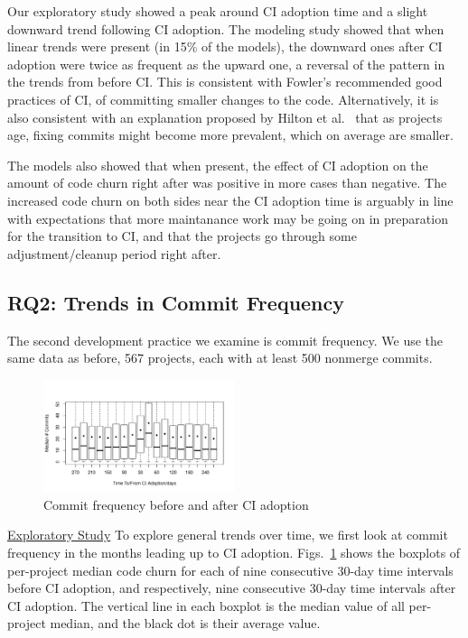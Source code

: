 Our exploratory study showed a peak around CI adoption time and a slight downward trend following CI adoption.
The modeling study showed that when linear trends were present (in 15\% of the models), the downward ones after CI adoption were twice  as frequent as the upward one, a reversal of the pattern in the trends from before CI.
This is consistent with Fowler's recommended good practices of CI, of committing smaller changes to the code.
Alternatively, it is also consistent with an explanation proposed by Hilton et al.~\cite{Hilton2016} that as projects age, fixing commits might become more prevalent, which on average are smaller.

The models also showed that when present, the effect of CI adoption on the amount of code churn right after was positive in more cases than negative.
The increased code churn on both sides near the CI adoption time is arguably in line with expectations that more maintanance work may be going on in preparation for the transition to CI, and that the projects go through some adjustment/cleanup period right after.


\subsection{RQ2: Trends in Commit Frequency}

The second development practice we examine is commit frequency.
We use the same data as before, 567 projects, each with at least 500 nonmerge commits.

\begin{figure}[!t]
\centering
\includegraphics[width=0.5\textwidth]{numbercommits.pdf}
\caption{Commit frequency before and after CI adoption}
\label{Fig:NumberCommits}
\end{figure}

\noindent \underline{Exploratory Study} To explore general trends over time, we first look at commit frequency in the months leading up to CI adoption.
Figs.~\ref{Fig:NumberCommits} shows the boxplots of per-project median code churn for each of nine consecutive 30-day time intervals before CI adoption, and respectively, nine consecutive 30-day time intervals after CI adoption.
The vertical line in each boxplot is the median value of all per-project median, and the black dot is their average value.

